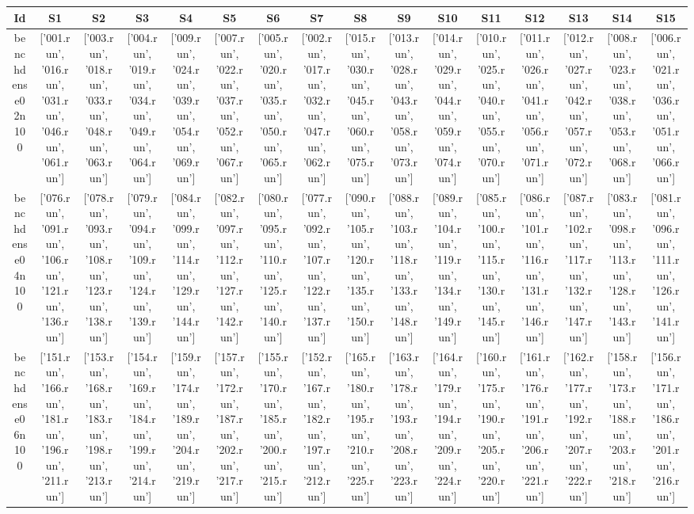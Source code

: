 \documentclass[landscape, 12pt]{report}
\begin{document}
\begin{tabular}{|c|c|c|c|c|c|c|c|c|c|c|c|c|c|c|c|}
\hline
\multicolumn{1}{|c|}{Id} & \multicolumn{1}{|c|}{S1} & \multicolumn{1}{|c|}{S2} & \multicolumn{1}{|c|}{S3} & \multicolumn{1}{|c|}{S4} & \multicolumn{1}{|c|}{S5} & \multicolumn{1}{|c|}{S6} & \multicolumn{1}{|c|}{S7} & \multicolumn{1}{|c|}{S8} & \multicolumn{1}{|c|}{S9} & \multicolumn{1}{|c|}{S10} & \multicolumn{1}{|c|}{S11} & \multicolumn{1}{|c|}{S12} & \multicolumn{1}{|c|}{S13} & \multicolumn{1}{|c|}{S14} & \multicolumn{1}{|c|}{S15}
\\
\hline
benchdense02n100 & ['001.run', '016.run', '031.run', '046.run', '061.run'] & ['003.run', '018.run', '033.run', '048.run', '063.run'] & ['004.run', '019.run', '034.run', '049.run', '064.run'] & ['009.run', '024.run', '039.run', '054.run', '069.run'] & ['007.run', '022.run', '037.run', '052.run', '067.run'] & ['005.run', '020.run', '035.run', '050.run', '065.run'] & ['002.run', '017.run', '032.run', '047.run', '062.run'] & ['015.run', '030.run', '045.run', '060.run', '075.run'] & ['013.run', '028.run', '043.run', '058.run', '073.run'] & ['014.run', '029.run', '044.run', '059.run', '074.run'] & ['010.run', '025.run', '040.run', '055.run', '070.run'] & ['011.run', '026.run', '041.run', '056.run', '071.run'] & ['012.run', '027.run', '042.run', '057.run', '072.run'] & ['008.run', '023.run', '038.run', '053.run', '068.run'] & ['006.run', '021.run', '036.run', '051.run', '066.run']
\\
benchdense04n100 & ['076.run', '091.run', '106.run', '121.run', '136.run'] & ['078.run', '093.run', '108.run', '123.run', '138.run'] & ['079.run', '094.run', '109.run', '124.run', '139.run'] & ['084.run', '099.run', '114.run', '129.run', '144.run'] & ['082.run', '097.run', '112.run', '127.run', '142.run'] & ['080.run', '095.run', '110.run', '125.run', '140.run'] & ['077.run', '092.run', '107.run', '122.run', '137.run'] & ['090.run', '105.run', '120.run', '135.run', '150.run'] & ['088.run', '103.run', '118.run', '133.run', '148.run'] & ['089.run', '104.run', '119.run', '134.run', '149.run'] & ['085.run', '100.run', '115.run', '130.run', '145.run'] & ['086.run', '101.run', '116.run', '131.run', '146.run'] & ['087.run', '102.run', '117.run', '132.run', '147.run'] & ['083.run', '098.run', '113.run', '128.run', '143.run'] & ['081.run', '096.run', '111.run', '126.run', '141.run']
\\
benchdense06n100 & ['151.run', '166.run', '181.run', '196.run', '211.run'] & ['153.run', '168.run', '183.run', '198.run', '213.run'] & ['154.run', '169.run', '184.run', '199.run', '214.run'] & ['159.run', '174.run', '189.run', '204.run', '219.run'] & ['157.run', '172.run', '187.run', '202.run', '217.run'] & ['155.run', '170.run', '185.run', '200.run', '215.run'] & ['152.run', '167.run', '182.run', '197.run', '212.run'] & ['165.run', '180.run', '195.run', '210.run', '225.run'] & ['163.run', '178.run', '193.run', '208.run', '223.run'] & ['164.run', '179.run', '194.run', '209.run', '224.run'] & ['160.run', '175.run', '190.run', '205.run', '220.run'] & ['161.run', '176.run', '191.run', '206.run', '221.run'] & ['162.run', '177.run', '192.run', '207.run', '222.run'] & ['158.run', '173.run', '188.run', '203.run', '218.run'] & ['156.run', '171.run', '186.run', '201.run', '216.run']

\end{tabular}
\end{document}

